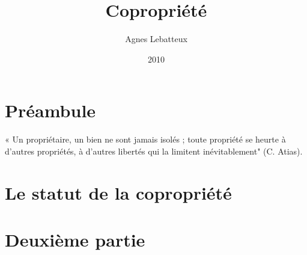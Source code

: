 \documentclass[10pt,a4paper,twoside]{book}
\author{Agnes Lebatteux}
\title{Copropriété}
\date{2010}
\begin{document}
	\maketitle
	
	\part*{Préambule}
	
		« Un propriétaire, un bien ne sont jamais isolés ; toute
		propriété se heurte à d’autres propriétés, à d’autres libertés
		qui la limitent inévitablement" (C. Atias).
	
		
	
	\part{Le statut de la copropriété}
	
		
		
		
		
		
		
		
		
		
		
		
		
		
		
		
	
	\part{Deuxième partie}
	
	\tableofcontents
	
\end{document}
